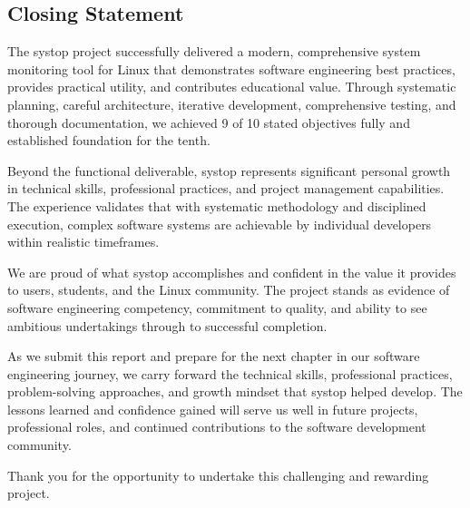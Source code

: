 \documentclass[12pt,a4paper,oneside]{report}
\begin{document}
\subsection{Closing Statement}

The systop project successfully delivered a modern, comprehensive system monitoring tool for Linux that demonstrates software engineering best practices, provides practical utility, and contributes educational value. Through systematic planning, careful architecture, iterative development, comprehensive testing, and thorough documentation, we achieved 9 of 10 stated objectives fully and established foundation for the tenth.

Beyond the functional deliverable, systop represents significant personal growth in technical skills, professional practices, and project management capabilities. The experience validates that with systematic methodology and disciplined execution, complex software systems are achievable by individual developers within realistic timeframes.

We are proud of what systop accomplishes and confident in the value it provides to users, students, and the Linux community. The project stands as evidence of software engineering competency, commitment to quality, and ability to see ambitious undertakings through to successful completion.

As we submit this report and prepare for the next chapter in our software engineering journey, we carry forward the technical skills, professional practices, problem-solving approaches, and growth mindset that systop helped develop. The lessons learned and confidence gained will serve us well in future projects, professional roles, and continued contributions to the software development community.

Thank you for the opportunity to undertake this challenging and rewarding project.


\end{document}
